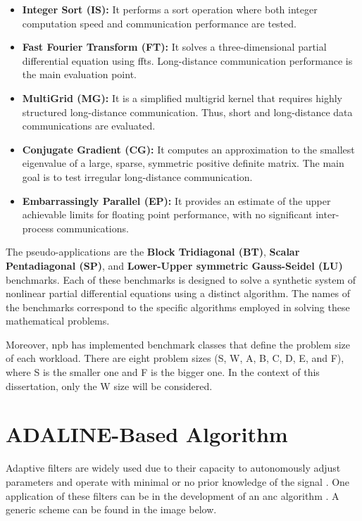 \begin{itemize}
    \item \textbf{Integer Sort (IS):} It performs a sort operation where both integer computation speed and communication performance are tested.

    \item \textbf{Fast Fourier Transform (FT):} It solves a three-dimensional partial differential equation using \glspl{fft}. 
        Long-distance communication performance is the main evaluation point. 

    \item \textbf{MultiGrid (MG):} It is a simplified multigrid kernel that requires highly structured long-distance communication. Thus, short and 
        long-distance data communications are evaluated.

    \item \textbf{Conjugate Gradient (CG):} It computes an approximation to
    the smallest eigenvalue of a large, sparse, symmetric positive definite matrix. The main goal is to test irregular long-distance communication.

    \item \textbf{Embarrassingly Parallel (EP):} It provides an estimate of the
    upper achievable limits for floating point performance, with no significant inter-process communications.
\end{itemize}

The pseudo-applications are the \textbf{Block Tridiagonal (BT)}, \textbf{Scalar Pentadiagonal (SP)}, and 
\textbf{Lower-Upper symmetric Gauss-Seidel (LU)} benchmarks. Each of these benchmarks is designed to solve a synthetic system of nonlinear partial 
differential equations using a distinct algorithm. The names of the benchmarks correspond to the specific algorithms employed in solving these 
mathematical problems.

Moreover, \gls{npb} has implemented benchmark classes that define the problem size of each workload. There are eight problem 
sizes (S, W, A, B, C, D, E, and F), where S is the smaller one and F is the bigger one. In the context of this dissertation, only the W size 
will be considered.


\section{ADALINE-Based Algorithm}

Adaptive filters are widely used due to their capacity to autonomously adjust parameters and operate with minimal or no prior 
knowledge of the signal \cite{haykin1996linear}. One application of these filters can be in the development 
of an \gls{anc} algorithm \cite{noiseCancelingADALINE}. A generic scheme can be found in the image below.

